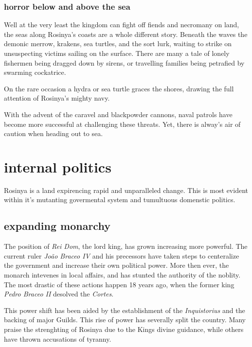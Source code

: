 \documentclass[../main.tex]{subfiles}
\begin{document}
\subsubsection{horror below and above the sea}
Well at the very least the kingdom can fight off fiends and necromany on land, the 
seas along Rosinya's coasts are a whole different story. Beneath the waves the 
demonic merrow, krakens, sea turtles, and the sort lurk, waiting to strike on unsuspecting 
victims sailing on the surface. There are many a tale of lonely fishermen being
dragged down by sirens, or travelling families being petrafied by swarming cockatrice.

On the rare occasion a hydra or sea turtle graces the shores, drawing the full
attention of Rosinya's mighty navy. 

With the advent of the caravel and blackpowder cannons, naval patrols have become more 
successful at challenging these threats. Yet, there is alway's air of caution 
when heading out to sea.


\section{internal politics}
Rosinya is a land expirencing rapid and unparalleled change. This is most evident within
it's mutanting govermental system and tumultuous domenstic politics.

\subsection{expanding monarchy}
The position of \emph{Rei Dom}, the lord king, has grown increasing more powerful. 
The current ruler \emph{João Braceo IV} and his precessors have taken steps to
centeralize the government and increase their own political power. More then ever, 
the monarch intevenes in local affairs, and has stunted the authority of the noblity.
The most drastic of these actions happen 18 years ago, when the former king \emph{Pedro Braceo II}
desolved the \emph{Cortes}.

This power shift has been aided by the establishment of the \emph{Inquistorius} and the 
backing of major Guilds. This rise of power has severally split the country. Many praise the 
strenghting of Rosinya due to the Kings divine guidance, while others have thrown 
accusations of tyranny.
\end{document}
